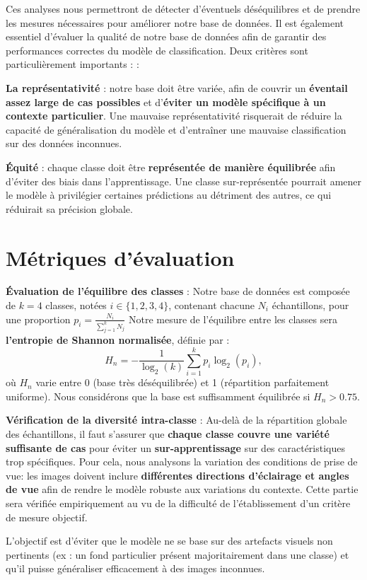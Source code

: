 \documentclass[11pt, openright]{book}
\begin{document}
    Ces analyses nous permettront de détecter d’éventuels déséquilibres et de prendre les mesures nécessaires pour améliorer notre base de données.
    Il est également essentiel d'évaluer la qualité de notre base de données afin de garantir des performances correctes du modèle de classification. Deux critères sont particulièrement importants :
    :
    \begin{items}{-15pt}{-15pt}
        \item \textbf{La représentativité} : notre base doit être variée,  afin de couvrir un \textbf{éventail assez large de cas possibles} et d’\textbf{éviter un modèle spécifique à un contexte particulier}. Une mauvaise représentativité risquerait de réduire la capacité de généralisation du modèle et d'entraîner une mauvaise classification sur des données inconnues.
        \item \textbf{Équité} : chaque classe doit être \textbf{représentée de manière équilibrée} afin d’éviter des biais dans l’apprentissage. Une classe sur-représentée pourrait amener le modèle à privilégier certaines prédictions au détriment des autres, ce qui réduirait sa précision globale.
    \end{items}

\newpage

\section{Métriques d’évaluation}
    \begin{items}{0pt}{-15pt}
        \item \textbf{Évaluation de l’équilibre des classes} :
        Notre base de données est composée de $k=4$ classes, notées $i\in \{1,2,3,4\}$, contenant chacune $N_i$ échantillons, pour une proportion $\displaystyle p_i= \frac{N_i}{\sum_{j=1}^k N_j}$
        Notre mesure de l’équilibre entre les classes sera \textbf{l’entropie de Shannon normalisée}, définie par : $${H_n = -\frac{1}{\log_2(k)} \sum_{i=1}^{k} p_i \log_2(p_i)},$$
        où $H_n$ varie entre 0 (base très déséquilibrée) et 1 (répartition parfaitement uniforme).
        Nous considérons que la base est suffisamment équilibrée si $H_n>0.75$.
         
        \item \textbf{Vérification de la diversité intra-classe} :
        Au-delà de la répartition globale des échantillons, il faut s’assurer que \textbf{chaque classe couvre une variété suffisante de cas} pour éviter un \textbf{sur-apprentissage} sur des caractéristiques trop spécifiques. Pour cela, nous analysons la variation des conditions de prise de vue: les images doivent inclure \textbf{différentes directions d’éclairage et angles de vue} afin de rendre le modèle robuste aux variations du contexte. Cette partie sera vérifiée empiriquement au vu de la difficulté de l’établissement d’un critère de mesure objectif.
        
        L’objectif est d’éviter que le modèle ne se base sur des artefacts visuels non pertinents (ex : un fond particulier présent majoritairement dans une classe) et qu’il puisse généraliser efficacement à des images inconnues.
    \end{items}
    
\end{document}
